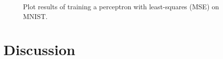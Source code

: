 \documentclass[journal]{IEEEtran}
\begin{document}
\begin{figure}[H]
	\centering
	\caption{Plot results of training a perceptron with least-squares (MSE) on MNIST.}
	\label{fig:mnistperceptronmse}
\end{figure}

\section{Discussion}
















 
\end{document}
